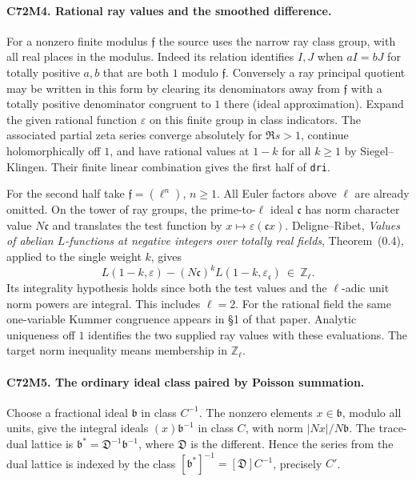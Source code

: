 \paragraph{C72M4. Rational ray values and the smoothed difference.}
For a nonzero finite modulus $\mathfrak f$ the source uses the
narrow ray class group, with all real places in the modulus.
Indeed its relation identifies $I,J$ when $aI=bJ$ for totally
positive $a,b$ that are both $1$ modulo $\mathfrak f$.
Conversely a ray principal quotient may be written in this form by
clearing its denominators away from $\mathfrak f$ with a totally
positive denominator congruent to $1$ there (ideal approximation).
Expand the given rational function $\varepsilon$ on this finite
group in class indicators. The associated partial zeta series
converge absolutely for $\Re s>1$, continue holomorphically off
$1$, and have rational values at $1-k$ for all $k\ge1$ by
Siegel--Klingen. Their finite linear combination gives the first
half of \texttt{dri}.

For the second half take $\mathfrak f=(\ell^n)$, $n\ge1$. All Euler
factors above $\ell$ are already omitted. On the tower of ray groups,
the prime-to-$\ell$ ideal $\mathfrak c$ has norm character value
$N\mathfrak c$ and translates the test function by
$x\mapsto\varepsilon(\mathfrak c x)$. Deligne--Ribet,
\emph{Values of abelian $L$-functions at negative integers over
totally real fields}, Theorem~(0.4), applied to the single weight
$k$, gives
\[
 L(1-k,\varepsilon)-(N\mathfrak c)^k L(1-k,\varepsilon_{\mathfrak c})
       \ \in\ \mathbb Z_\ell .
\]
Its integrality hypothesis holds since both the test values and the
$\ell$-adic unit norm powers are integral. This includes $\ell=2$.
For the rational field the same one-variable Kummer congruence
appears in \S1 of that paper.
Analytic uniqueness off $1$ identifies the two supplied ray values
with these evaluations. The target norm inequality means membership
in $\mathbb Z_\ell$.

\paragraph{C72M5. The ordinary ideal class paired by Poisson summation.}
Choose a fractional ideal $\mathfrak b$ in class $C^{-1}$.
The nonzero elements $x\in\mathfrak b$, modulo all units, give the
integral ideals $(x)\mathfrak b^{-1}$ in class $C$, with norm
$|N x|/N\mathfrak b$. The trace-dual lattice is
$\mathfrak b^*=\mathfrak D^{-1}\mathfrak b^{-1}$, where
$\mathfrak D$ is the different. Hence the series from the dual
lattice is indexed by the class
$[\mathfrak b^*]^{-1}=[\mathfrak D]C^{-1}$, precisely $C'$.


